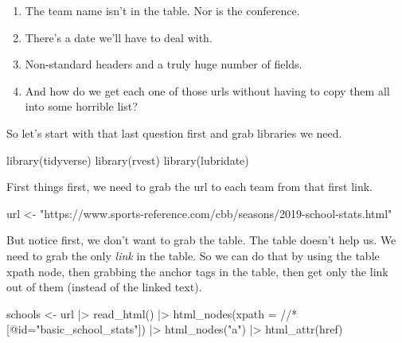 \documentclass[
  letterpaper,
  DIV=11,
  numbers=noendperiod]{scrreprt}
\newenvironment{Shaded}{\begin{snugshade}}{\end{snugshade}}
\newcommand{\AttributeTok}[1]{\textcolor[rgb]{0.40,0.45,0.13}{#1}}
\newcommand{\FunctionTok}[1]{\textcolor[rgb]{0.28,0.35,0.67}{#1}}
\newcommand{\NormalTok}[1]{\textcolor[rgb]{0.00,0.23,0.31}{#1}}
\newcommand{\OtherTok}[1]{\textcolor[rgb]{0.00,0.23,0.31}{#1}}
\newcommand{\SpecialCharTok}[1]{\textcolor[rgb]{0.37,0.37,0.37}{#1}}
\newcommand{\StringTok}[1]{\textcolor[rgb]{0.13,0.47,0.30}{#1}}
\providecommand{\tightlist}{%
  \setlength{\itemsep}{0pt}\setlength{\parskip}{0pt}}\usepackage{longtable,booktabs,array}
\begin{document}
\begin{enumerate}
\def\labelenumi{\arabic{enumi}.}
\tightlist
\item
  The team name isn't in the table. Nor is the conference.
\item
  There's a date we'll have to deal with.
\item
  Non-standard headers and a truly huge number of fields.
\item
  And how do we get each one of those urls without having to copy them
  all into some horrible list?
\end{enumerate}

So let's start with that last question first and grab libraries we need.

\begin{Shaded}
\begin{Highlighting}[]
\FunctionTok{library}\NormalTok{(tidyverse)}
\FunctionTok{library}\NormalTok{(rvest)}
\FunctionTok{library}\NormalTok{(lubridate)}
\end{Highlighting}
\end{Shaded}

First things first, we need to grab the url to each team from that first
link.

\begin{Shaded}
\begin{Highlighting}[]
\NormalTok{url }\OtherTok{\textless{}{-}} \StringTok{"https://www.sports{-}reference.com/cbb/seasons/2019{-}school{-}stats.html"}
\end{Highlighting}
\end{Shaded}

But notice first, we don't want to grab the table. The table doesn't
help us. We need to grab the only \emph{link} in the table. So we can do
that by using the table xpath node, then grabbing the anchor tags in the
table, then get only the link out of them (instead of the linked text).

\begin{Shaded}
\begin{Highlighting}[]
\NormalTok{schools }\OtherTok{\textless{}{-}}\NormalTok{ url }\SpecialCharTok{|\textgreater{}}
  \FunctionTok{read\_html}\NormalTok{() }\SpecialCharTok{|\textgreater{}}
  \FunctionTok{html\_nodes}\NormalTok{(}\AttributeTok{xpath =} \StringTok{\textquotesingle{}//*[@id="basic\_school\_stats"]\textquotesingle{}}\NormalTok{) }\SpecialCharTok{|\textgreater{}}
  \FunctionTok{html\_nodes}\NormalTok{(}\StringTok{"a"}\NormalTok{) }\SpecialCharTok{|\textgreater{}}
  \FunctionTok{html\_attr}\NormalTok{(}\StringTok{\textquotesingle{}href\textquotesingle{}}\NormalTok{)}
\end{Highlighting}
\end{Shaded}
\end{document}
